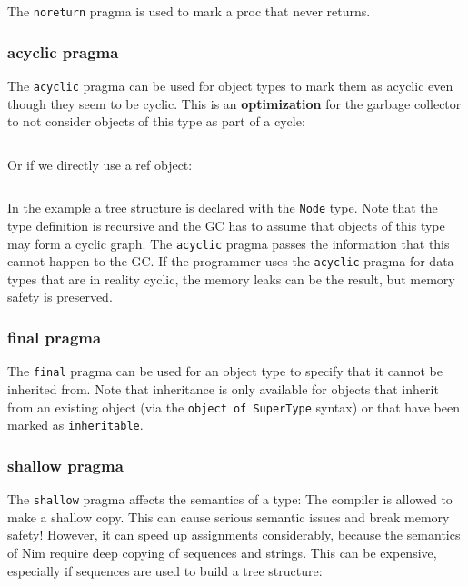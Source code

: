 The \texttt{noreturn} pragma is used to mark a proc that never returns.

\hypertarget{acyclic-pragma}{%
\subsubsection{acyclic pragma}\label{acyclic-pragma}}

The \texttt{acyclic} pragma can be used for object types to mark them as
acyclic even though they seem to be cyclic. This is an
\textbf{optimization} for the garbage collector to not consider objects
of this type as part of a cycle:

\begin{verbatim}
\end{verbatim}

Or if we directly use a ref object:

\begin{verbatim}
\end{verbatim}

In the example a tree structure is declared with the \texttt{Node} type.
Note that the type definition is recursive and the GC has to assume that
objects of this type may form a cyclic graph. The \texttt{acyclic}
pragma passes the information that this cannot happen to the GC. If the
programmer uses the \texttt{acyclic} pragma for data types that are in
reality cyclic, the memory leaks can be the result, but memory safety is
preserved.

\hypertarget{final-pragma}{%
\subsubsection{final pragma}\label{final-pragma}}

The \texttt{final} pragma can be used for an object type to specify that
it cannot be inherited from. Note that inheritance is only available for
objects that inherit from an existing object (via the
\texttt{object\ of\ SuperType} syntax) or that have been marked as
\texttt{inheritable}.

\hypertarget{shallow-pragma}{%
\subsubsection{shallow pragma}\label{shallow-pragma}}

The \texttt{shallow} pragma affects the semantics of a type: The
compiler is allowed to make a shallow copy. This can cause serious
semantic issues and break memory safety! However, it can speed up
assignments considerably, because the semantics of Nim require deep
copying of sequences and strings. This can be expensive, especially if
sequences are used to build a tree structure:

